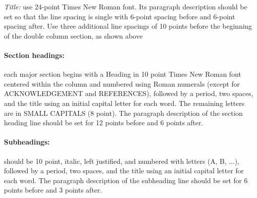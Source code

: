 \documentclass{article}
\begin{document}
\textit{Title:} use 24-point Times New Roman font. Its paragraph description should be set so that the line spacing is single with 6-point spacing before and 6-point spacing after. Use three additional line spacings of 10 points before the beginning of the double column section, as shown above

\paragraph{Section headings:} each major section begins with a Heading in 10 point Times New Roman font centered within the column and numbered using Roman numerals (except for ACKNOWLEDGEMENT and REFERENCES), followed by a period, two spaces, and the title using an  initial capital letter for each word. The remaining letters are in SMALL CAPITALS (8 point). The paragraph description of the section heading line should be set for 12 points before and 6 points after. 

\paragraph{Subheadings:}should be 10 point, italic, left justified, and numbered with letters (A, B, ...), followed by a period, two spaces, and the title using an initial capital letter for each word. The paragraph description of the subheading line should be set for 6 points before and 3 points after. 



\end{document}
